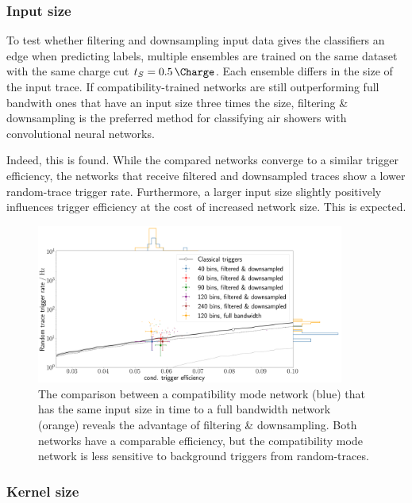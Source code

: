 \subsubsection{Input size}
\label{sssec:input-size}

To test whether filtering and downsampling input data gives the classifiers an edge when predicting labels, multiple ensembles are trained on the same dataset with 
the same charge cut $t_S = \SI{0.5}{\Charge}$. Each ensemble differs in the size of the input trace. If compatibility-trained networks are still outperforming full 
bandwith ones that have an input size three times the size, filtering \& downsampling is the preferred method for classifying air showers with convolutional neural
networks.

Indeed, this is found. While the compared networks converge to a similar trigger efficiency, the networks that receive filtered and downsampled traces show a lower 
random-trace trigger rate. Furthermore, a larger input size slightly positively influences trigger efficiency at the cost of increased network size. This is 
expected.

\begin{figure}
	\centering
	\includegraphics[width=0.9\textwidth]{./plots/CNN_input_size.png}
	\caption{The comparison between a compatibility mode network (blue) that has the same input size in time to a full bandwidth network (orange) reveals the 
	advantage of filtering \& downsampling. Both networks have a comparable efficiency, but the compatibility mode network is less sensitive to background
	triggers from random-traces.}
	\label{fig:CNN-input-size}
\end{figure}

\subsubsection{Kernel size}
\label{sssec:kernel-size}

